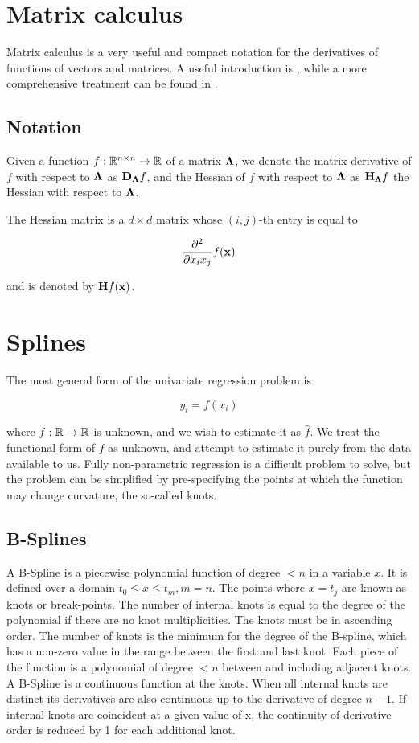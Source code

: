 \documentclass{article}[12pt]
\begin{document}
\section{Matrix calculus}

Matrix calculus is a very useful and compact notation for the derivatives of functions of vectors and matrices.
A useful introduction is \cite{wand02}, while a more comprehensive treatment can be found in
\cite{MagnusNeudecker99}.

\subsection{Notation}

Given a function $f:{\mathbb{R}}^{n \times n} \to {\mathbb{R}}$ of a matrix ${\boldsymbol \Lambda}$, we denote the matrix derivative of $f$ with 
respect to ${\boldsymbol \Lambda}$ as ${\bf D}_{\boldsymbol \Lambda} f$, and the Hessian of $f$ with respect to ${\boldsymbol \Lambda}$ as
${\bf H}_{\boldsymbol \Lambda} f$ the Hessian with respect to ${\boldsymbol \Lambda}$.

The Hessian matrix is a $d \times d$ matrix whose $(i, j)$-th entry is equal to

$$
\frac{\partial^2}{\partial x_i x_j} f({\bf x})
$$

and is denoted by ${\bf H} f({\bf x})$.

\section{Splines}
The most general form of the univariate regression problem is

$$
y_i = f(x_i)
$$

where $f: {\mathbb{R}} \to {\mathbb{R}}$ is unknown, and we wish to estimate it as $\hat{f}$. We treat the functional form of
$f$ as unknown, and attempt to estimate it purely from the data available to us. Fully non-parametric regression
is a difficult problem to solve, but the problem can be simplified by pre-specifying the points at which the
function may change curvature, the so-called knots.

\subsection{B-Splines}
A B-Spline is a piecewise polynomial function of degree $< n$ in a variable $x$. It is defined over a
domain $t_0 \leq x \leq t_m, m=n$. The points where $x = t_j$ are known as knots or break-points. The
number of internal knots is equal to the degree of the polynomial if there are no knot multiplicities.
The knots must be in ascending order. The number of knots is the minimum for the degree of the B-spline,
which has a non-zero value in the range between the first and last knot. Each piece of the function is a
polynomial of degree $< n$ between and including adjacent knots. A B-Spline is a continuous function at the
knots. When all internal knots are distinct its derivatives are also continuous up to the derivative of degree
$n - 1$. If internal knots are coincident at a given value of x, the continuity of derivative order is reduced
by 1 for each additional knot.
\end{document}
